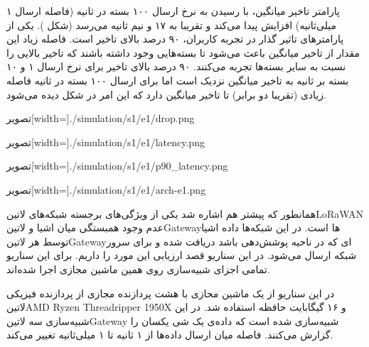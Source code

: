 پارامتر تاخیر میانگین، با رسیدن به نرخ ارسال ۱۰۰ بسته در ثانیه (فاصله ارسال ۱ میلی‌ثانیه) افزایش پیدا می‌کند و
تقریبا به ۱۷ و نیم ثانیه می‌رسد (شکل ).
یکی از پارامترهای تاثیر گذار در تجربه کاربران، ۹۰ درصد بالای تاخیر است.
فاصله زیاد این مقدار از تاخیر میانگین باعث می‌شود تا بسته‌هایی وجود داشته باشند که تاخیر بالایی را نسبت به سایر بسته‌ها تجربه می‌کنند.
۹۰ درصد بالای تاخیر برای نرخ ارسال ۱ و ۱۰ بسته بر ثانیه به تاخیر میانگین نزدیک است اما برای ارسال ۱۰۰ بسته در ثانیه فاصله زیادی (تقریبا دو برابر) تا تاخیر میانگین دارد که این امر
در شکل  دیده می‌شود.

‌تصویر[width=\textwidth]{./simulation/s1/e1/drop.png}

‌تصویر[width=\textwidth]{./simulation/s1/e1/latency.png}

‌تصویر[width=\textwidth]{./simulation/s1/e1/p90_latency.png}

‌تصویر[width=\textwidth]{./simulation/s1/e1/arch-e1.png}


همانطور که پیشتر هم اشاره شد یکی از ویژگی‌های برجسته شبکه‌های ‌لاتین{LoRaWAN} عدم وجود
همبستگی میان اشیا و ‌لاتین{Gateway}ها است. در این شبکه‌ها داده اشیا توسط هر ‌لاتین{Gateway}ای
که در ناحیه پوشش‌دهی باشد دریافت شده و برای سرور شبکه ارسال می‌شود.
در این سناریو قصد ارزیابی این مورد را داریم.
برای این سناریو تمامی اجزای شبیه‌سازی روی همین ماشین مجازی اجرا شده‌اند.

در این سناریو از یک ماشین محازی با هشت پردازنده مجازی از پردازنده فیزیکی
‌لاتین{AMD Ryzen Threadripper 1950X}
و ۱۶ گیگابایت حافظه استفاده شد.
در این شبیه‌سازی سه ‌لاتین{Gateway} شبیه‌سازی شده است که داده‌ی یک شی یکسان را گزارش می‌کنند. فاصله میان ارسال داده‌ها از ۱ ثانیه تا ۱ میلی‌ثانیه تغییر می‌کند.

